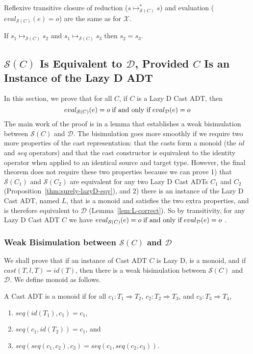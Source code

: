 \documentclass[acmsmall,review]{acmart}\settopmatter{printfolios=true,printccs=false,printacmref=false}
\newcommand{\judgeSreduce}[3]{#2 \longmapsto_{\mathcal{S}(#1)} #3}
\newcommand{\judgeSreduceTrans}[3]{#2 \longmapsto_{\mathcal{S}(#1)}^{*} #3}
\newcommand{\judgeSeval}[3]{eval_{\mathcal{S}(#1)}(#2) = #3}
\newcommand{\ineffCEK}{\ensuremath{\mathcal{X}}}
\newcommand{\ineffCEKD}{\ensuremath{\mathcal{D}}}
\newcommand{\effCEK}[1]{\ensuremath{\mathcal{S}(#1)}}
\newcommand{\evalEqv}[2]{
	\ensuremath{
		eval_{\text{#1}}(e) = o
		\;\text{if and only if}\;
		eval_{\text{#2}}(e) = o}
}
\begin{document}
Reflexive transitive closure of reduction ($\judgeSreduceTrans{C}{s}{s}$) and
evaluation ($\judgeSeval{C}{e}{o}$) are the same as for \ineffCEK.

\begin{proposition}[\effCEK{C} is deterministic]
	\label{prp:SC-deterministic}
	If $\judgeSreduce{C}{s_1}{s_2}$ and $\judgeSreduce{C}{s_1}{s_3}$ 
	then $s_2 = s_3$.
\end{proposition}

\subsection{\effCEK{C} Is Equivalent to \ineffCEKD{}, Provided $C$ Is an Instance of the Lazy D ADT}
\label{secc:framework:monoid-correct}

In this section, we prove that for all $C$, if $C$ is a Lazy D Cast
ADT, then
\[
  \evalEqv{\effCEK{C}}{\ineffCEKD}
\]
The main work of the proof is in a lemma that establishes a weak
bisimulation between \effCEK{C} and \ineffCEKD{}.  The bisimulation
goes more smoothly if we require two more properties of the cast
representation: that the casts form a monoid (the $id$ and $seq$
operators) and that the cast constructor is equivalent to the identity
operator when applied to an identical source and target type.
However, the final theorem does not require these two properties
because we can prove 1) that \effCEK{C_1} and \effCEK{C_2} are
equivalent for any two Lazy D Cast ADTs $C_1$ and $C_2$
(Proposition~\ref{thm:surely-lazyD-eqv}), and 2) there is an instance
of the Lazy D Cast ADT, named $L$, that is a monoid and satisfies the
two extra properties, and is therefore equivalent to \ineffCEKD{}
(Lemma~\ref{lem:L-correct}). So by transitivity, for any Lazy D Cast
ADT $C$ we have \evalEqv{\effCEK{C}}{\ineffCEKD}.

\subsubsection{Weak Bisimulation between \effCEK{C} and \ineffCEKD{}}

We shall prove that if an instance of Cast ADT $C$ is Lazy D, is a
monoid, and if $cast(T,l,T) = id(T)$, then there is
a weak bisimulation between \effCEK{C} and \ineffCEKD{}.
We define monoid as follows.

\begin{definition}[Monoid]
	\label{def:monoid}
  A Cast ADT is a monoid if 
  for all
  $c_1 : T_1 \Longrightarrow T_2$,
  $c_2 : T_2 \Longrightarrow T_3$, and
  $c_3 : T_3 \Longrightarrow T_4$,
  \begin{enumerate}
    \item $seq(id(T_1),c_1) = c_1$,
    \item $seq(c_1,id(T_2)) = c_1$, and
    \item $seq(seq(c_1, c_2), c_3) = seq(c_1, seq(c_2, c_3))$.
  \end{enumerate}
\end{definition}
\end{document}
